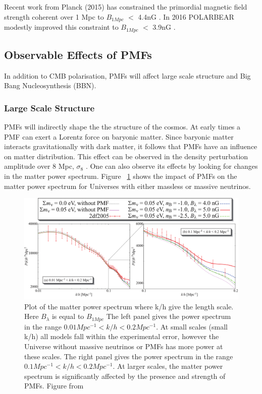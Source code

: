 Recent work from Planck (2015) has constrained the primordial magnetic field strength coherent over 1 Mpc to $B_{1Mpc}$ $<$ 4.4nG \cite{Ade:2015cva}. In 2016 POLARBEAR modestly improved this constraint to $B_{1Mpc}$ $<$ 3.9nG \cite{Ade:2015cao}.
\subsection{Observable Effects of PMFs}

In addition to CMB polarisation, PMFs will affect large scale structure and Big Bang Nucleosynthesis (BBN).

\subsubsection{Large Scale Structure}

PMFs will indirectly shape the the structure of the cosmos. At early times a PMF can exert a Lorentz force on baryonic matter. Since baryonic matter interacts gravitationally with dark matter, it follows that PMFs have an influence on matter distribution. This effect can be observed in the density perturbation amplitude over 8 Mpc, $\sigma_8$ \cite{Yamazaki:2012pg}. One can also observe its effects by looking for changes in the matter power spectrum. Figure ~\ref{fig:matterpower} shows the impact of PMFs on the matter power spectrum for Universes with either massless or massive neutrinos.

\begin{figure}[ht]
\centering
\includegraphics[scale=1.1]{images/matterpower.png} 
\caption{Plot of the matter power spectrum where k/h give the length scale. Here $B_{\lambda}$ is equal to $B_{1Mpc}$ The left panel gives the power spectrum in the range $0.01 Mpc^{-1} < k/h < 0.2 Mpc^{-1}$. At small scales (small k/h) all models fall within the experimental error, however the Universe without massive neutrinos or PMFs has more power at these scales. The right panel gives the power spectrum in the range $0.1 Mpc^{-1} < k/h < 0.2 Mpc^{-1}$. At larger scales, the matter power spectrum is significantly affected by the presence and strength of PMFs. Figure from \cite{Yamazaki:2012pg}}
\label{fig:matterpower}
\end{figure}

